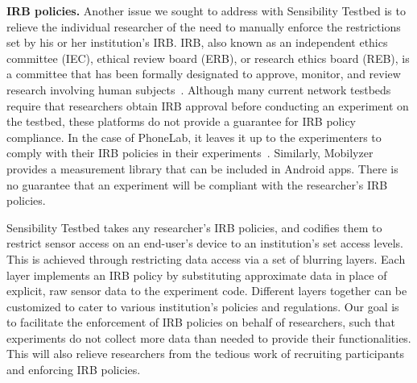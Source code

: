\textbf{IRB policies.}
Another issue we sought to address with Sensibility Testbed is to 
relieve the individual researcher of the need to manually enforce 
the restrictions set by his or her institution's IRB.
IRB, also known as an independent ethics committee (IEC), ethical 
review board (ERB), or research ethics board (REB), is a committee 
that has been formally designated to approve, monitor, and review 
research involving human subjects~\cite{irb}. Although many current network 
testbeds require that researchers obtain IRB approval before conducting
an experiment on the testbed, these platforms do not provide a guarantee 
for IRB policy compliance. In the case of PhoneLab, 
it leaves it up to the experimenters to comply with their IRB policies in their 
experiments~\cite{nandugudi2013phonelab}. Similarly, 
Mobilyzer~\cite{nikravesh2015mobilyzer} provides a measurement
library that can be included in Android apps. 
There is no guarantee that an 
experiment will be compliant with the researcher's IRB policies.

Sensibility Testbed takes any researcher's IRB policies, and codifies 
them to restrict sensor access on an end-user's device to 
an institution's set access levels. 
This is achieved through restricting data access  via
a set of blurring layers. Each layer implements an IRB policy by substituting 
approximate data in place of explicit, raw sensor data to the experiment code. Different layers 
together can be customized to cater to various institution's 
policies and regulations. Our goal is to facilitate the enforcement of 
IRB policies on behalf of researchers, such that experiments 
do not collect more data than needed to provide their functionalities.
This will also relieve researchers from the tedious work of 
recruiting participants and enforcing IRB policies.